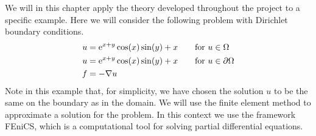
We will in this chapter apply the theory developed throughout the project to a specific example. 
Here we will consider the following problem with Dirichlet boundary conditions.
\begin{alignat*}{2}
    u &= \text{e}^{x+y}\cos(x)\sin(y)+x && \quad\text{for }u\in\Omega \\
    u &= \text{e}^{x+y}\cos(x)\sin(y)+x && \quad \text{for } u\in\partial\Omega\\
    f &= -\nabla u\quad && \quad 
\end{alignat*}
Note in this example that, for simplicity, we have chosen the solution $u$ to be the same on the boundary as in the domain.
We will use the finite element method to approximate a solution for the problem. In this context we use the framework FEniCS,
which is a computational tool for solving partial differential equations. 